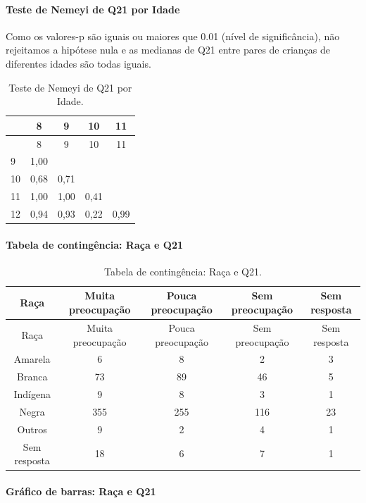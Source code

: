 \documentclass[]{article}
\let\oldparagraph\paragraph
\renewcommand{\paragraph}[1]{\oldparagraph{#1}\mbox{}}
\begin{document}
\hypertarget{teste-de-nemeyi-de-q21-por-idade}{%
\paragraph{Teste de Nemeyi de Q21 por Idade}\label{teste-de-nemeyi-de-q21-por-idade}}

Como os valores-p são iguais ou maiores que 0.01 (nível de significância), não rejeitamos a hipótese nula e as medianas de Q21 entre pares de crianças de diferentes idades são todas iguais.

\begin{longtable}[]{@{}lcccc@{}}
\caption{\label{tab:unnamed-chunk-455}Teste de Nemeyi de Q21 por Idade.}\tabularnewline
\toprule
& 8 & 9 & 10 & 11\tabularnewline
\midrule
\endfirsthead
\toprule
& 8 & 9 & 10 & 11\tabularnewline
\midrule
\endhead
9 & 1,00 & & &\tabularnewline
10 & 0,68 & 0,71 & &\tabularnewline
11 & 1,00 & 1,00 & 0,41 &\tabularnewline
12 & 0,94 & 0,93 & 0,22 & 0,99\tabularnewline
\bottomrule
\end{longtable}

\cleardoublepage

\hypertarget{tabela-de-continguxeancia-rauxe7a-e-q21}{%
\paragraph{Tabela de contingência: Raça e Q21}\label{tabela-de-continguxeancia-rauxe7a-e-q21}}

\begin{longtable}[]{@{}ccccc@{}}
\caption{\label{tab:unnamed-chunk-456}Tabela de contingência: Raça e Q21.}\tabularnewline
\toprule
Raça & Muita preocupação & Pouca preocupação & Sem preocupação & Sem resposta\tabularnewline
\midrule
\endfirsthead
\toprule
Raça & Muita preocupação & Pouca preocupação & Sem preocupação & Sem resposta\tabularnewline
\midrule
\endhead
Amarela & 6 & 8 & 2 & 3\tabularnewline
Branca & 73 & 89 & 46 & 5\tabularnewline
Indígena & 9 & 8 & 3 & 1\tabularnewline
Negra & 355 & 255 & 116 & 23\tabularnewline
Outros & 9 & 2 & 4 & 1\tabularnewline
Sem resposta & 18 & 6 & 7 & 1\tabularnewline
\bottomrule
\end{longtable}

\hypertarget{gruxe1fico-de-barras-rauxe7a-e-q21}{%
\paragraph{Gráfico de barras: Raça e Q21}\label{gruxe1fico-de-barras-rauxe7a-e-q21}}
\end{document}
